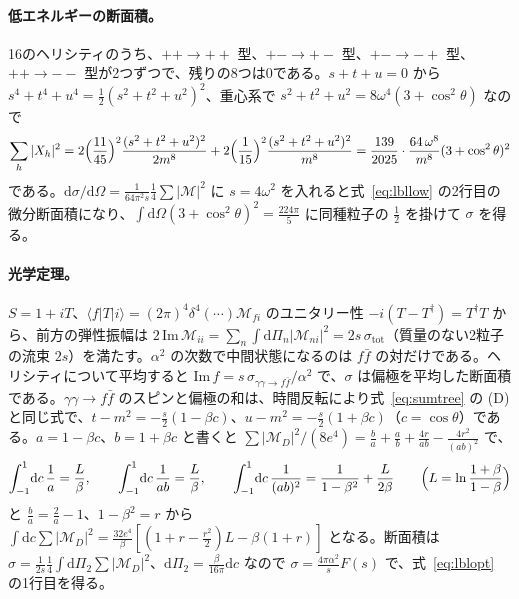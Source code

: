 \documentclass[a4paper,10pt]{ltjsarticle}
\newcommand{\dd}{\mathrm{d}}
\begin{document}
\paragraph{低エネルギーの断面積。}16のヘリシティのうち、$++\to++$ 型、$+-\to+-$ 型、$+-\to-+$ 型、$++\to--$ 型が2つずつで、残りの8つは0である。$s+t+u=0$ から $s^4+t^4+u^4=\frac12(s^2+t^2+u^2)^2$、重心系で $s^2+t^2+u^2=8\omega^4(3+\cos^2\theta)$ なので
\begin{equation*}
\sum_h|X_h|^2=2\Bigl(\frac{11}{45}\Bigr)^2\frac{(s^2+t^2+u^2)^2}{2m^8}+2\Bigl(\frac1{15}\Bigr)^2\frac{(s^2+t^2+u^2)^2}{m^8}=\frac{139}{2025}\cdot\frac{64\,\omega^8}{m^8}(3+\cos^2\theta)^2
\end{equation*}
である。$\dd\sigma/\dd\Omega=\frac{1}{64\pi^2s}\frac14\sum|\mathcal M|^2$ に $s=4\omega^2$ を入れると式~\eqref{eq:lbllow} の2行目の微分断面積になり、$\int\dd\Omega(3+\cos^2\theta)^2=\frac{224\pi}{5}$ に同種粒子の $\frac12$ を掛けて $\sigma$ を得る。

\paragraph{光学定理。}$S=1+iT$、$\langle f|T|i\rangle=(2\pi)^4\delta^4(\cdots)\mathcal M_{fi}$ のユニタリー性 $-i(T-T^\dagger)=T^\dagger T$ から、前方の弾性振幅は $2\,\mathrm{Im}\,\mathcal M_{ii}=\sum_n\int\dd\Pi_n|\mathcal M_{ni}|^2=2s\,\sigma_{\mathrm{tot}}$（質量のない2粒子の流束 $2s$）を満たす。$\alpha^2$ の次数で中間状態になるのは $f\bar f$ の対だけである。ヘリシティについて平均すると $\mathrm{Im}\,f=s\,\sigma_{\gamma\gamma\to f\bar f}/\alpha^2$ で、$\sigma$ は偏極を平均した断面積である。$\gamma\gamma\to f\bar f$ のスピンと偏極の和は、時間反転により式~\eqref{eq:sumtree} の (D) と同じ式で、$t-m^2=-\frac s2(1-\beta c)$、$u-m^2=-\frac s2(1+\beta c)$（$c=\cos\theta$）である。$a=1-\beta c$、$b=1+\beta c$ と書くと $\sum|\mathcal M_D|^2/(8e^4)=\frac ba+\frac ab+\frac{4r}{ab}-\frac{4r^2}{(ab)^2}$ で、
\begin{equation*}
\int_{-1}^1\!\dd c\,\frac1a=\frac L\beta,\qquad\int_{-1}^1\!\dd c\,\frac{1}{ab}=\frac{L}{\beta},\qquad\int_{-1}^1\!\dd c\,\frac{1}{(ab)^2}=\frac{1}{1-\beta^2}+\frac{L}{2\beta}\qquad\Bigl(L=\ln\frac{1+\beta}{1-\beta}\Bigr)
\end{equation*}
と $\frac ba=\frac2a-1$、$1-\beta^2=r$ から $\int\dd c\sum|\mathcal M_D|^2=\frac{32e^4}{\beta}[(1+r-\frac{r^2}2)L-\beta(1+r)]$ となる。断面積は $\sigma=\frac{1}{2s}\frac14\int\dd\Pi_2\sum|\mathcal M_D|^2$、$\dd\Pi_2=\frac{\beta}{16\pi}\dd c$ なので $\sigma=\frac{4\pi\alpha^2}{s}F(s)$ で、式~\eqref{eq:lblopt} の1行目を得る。
\end{document}
